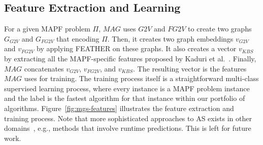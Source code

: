 \documentclass[letterpaper]{article} %
\newcommand{\Omri}[1]{}
\newcommand{\Carmel}[1]{}
\newcommand{\gtv}[1]{\ensuremath{\textit{G2V}}\xspace}
\newcommand{\fgtv}[1]{\ensuremath{\textit{FG2V}}\xspace}
\newcommand{\kaduri}[1]{\ensuremath{\textit{KBS}}\xspace}
\newcommand{\mapfgas}[1]{\ensuremath{\textit{MAG}}\xspace}
\begin{document}
\subsection{Feature Extraction and Learning}


For a given MAPF problem $\Pi$, \mapfgas\ uses \gtv\ and \fgtv\ to create two graphs $G_\gtv\ $ and $G_\fgtv\ $ that encoding $\Pi$. 
Then, it creates two graph embeddings $v_\gtv\ $ and $v_\fgtv\ $ by applying FEATHER on these graphs. 
It also creates a vector $v_\kaduri\ $ by extracting all the MAPF-specific features proposed by Kaduri et al.~\cite{kaduri2020algorithm}. 
Finally, \mapfgas\ concatenates 
$v_\gtv\ $, $v_\fgtv\ $, and $v_\kaduri\ $. 
The resulting vector is the features \mapfgas\ uses for training. 
The training process itself is a straightforward multi-class supervised learning process, 
where every instance is a MAPF problem instance and the label is the fastest algorithm for that instance within our portfolio of algorithms. 
Figure~\ref{fig:mgs-features} illustrates the feature extraction and training process. 
Note that more sophisticated approaches to AS exists in other domains~\cite{kerschke2019automated}, e.g., methods that involve runtime predictions. This is left for future work.  
\end{document}
